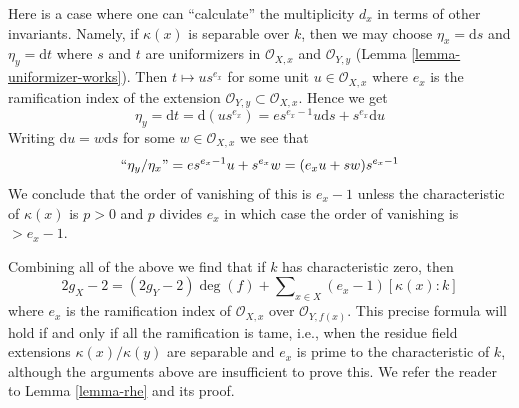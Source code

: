 \medskip\noindent
Here is a case where one can ``calculate'' the multiplicity $d_x$ in terms
of other invariants. Namely, if $\kappa(x)$ is separable over $k$, then
we may choose $\eta_x = \text{d}s$ and $\eta_y = \text{d}t$ where $s$
and $t$ are uniformizers in $\mathcal{O}_{X, x}$ and $\mathcal{O}_{Y, y}$
(Lemma \ref{lemma-uniformizer-works}).
Then $t \mapsto u s^{e_x}$ for some unit $u \in \mathcal{O}_{X, x}$
where $e_x$ is the ramification index of the extension
$\mathcal{O}_{Y, y} \subset \mathcal{O}_{X, x}$. Hence we get
$$
\eta_y = \text{d}t = \text{d}(u s^{e_x}) =
e s^{e_x - 1} u \text{d}s + s^{e_x} \text{d}u
$$
Writing $\text{d}u = w \text{d}s$ for some $w \in \mathcal{O}_{X, x}$
we see that
$$
``\eta_y/\eta_x" = e s^{e_x - 1} u + s^{e_x} w = (e_x u + s w)s^{e_x - 1}
$$
We conclude that the order of vanishing of this is $e_x - 1$
unless the characteristic of $\kappa(x)$ is $p > 0$ and $p$ divides $e_x$
in which case the order of vanishing is $> e_x - 1$.

\medskip\noindent
Combining all of the above we find that if $k$ has characteristic
zero, then
$$
2g_X - 2 = (2g_Y - 2)\deg(f) +
\sum\nolimits_{x \in X} (e_x - 1)[\kappa(x) : k]
$$
where $e_x$ is the ramification index of $\mathcal{O}_{X, x}$ over
$\mathcal{O}_{Y, f(x)}$. This precise formula will hold if and only
if all the ramification is tame, i.e., when the
residue field extensions $\kappa(x)/\kappa(y)$ are separable and
$e_x$ is prime to the characteristic of $k$, although the
arguments above are insufficient to prove this. We refer the reader
to Lemma \ref{lemma-rhe} and its proof.

